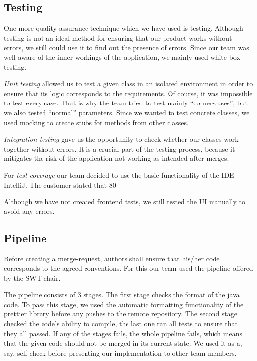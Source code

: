 \subsection{Testing}
One more quality assurance technique which we have used is testing. Although testing is not an ideal method for ensuring that our product works without errors, we still could use it to find out the presence of errors. Since our team was well aware of the inner workings of the application, we mainly used white-box testing.

\emph{Unit testing} allowed us to test a given class in an isolated environment in order to ensure that its logic corresponds to the requirements. Of course, it was impossible to test every case. That is why the team tried to test mainly “corner-cases”, but we also tested “normal” parameters.  Since we wanted to test concrete classes, we used mocking to create stubs for methods from other classes.

\emph{Integration testing} gave us the opportunity to check whether our classes work together without errors. It is a crucial part of the testing process, because it mitigates the risk of the application not working as intended after merges.

For \emph{test coverage} our team decided to use the basic functionality of the IDE IntelliJ. The customer stated that 80%

Although we have not created frontend tests, we still tested the UI manually to avoid any errors.

\subsection{Pipeline}
Before creating a merge-request, authors shall ensure that his/her code corresponds to the agreed conventions. For this our team used the pipeline offered by the SWT chair.

The pipeline consists of 3 stages. The first stage checks the format of the java code. To pass this stage, we used the automatic formatting functionality of the prettier library before any pushes to the remote repository. The second stage checked the code’s ability to compile, the last one ran all tests to ensure that they all passed. If any of the stages fails, the whole pipeline fails, which means that the given code should not be merged in its current state. We used it as a, say, self-check before presenting our implementation to other team members.


